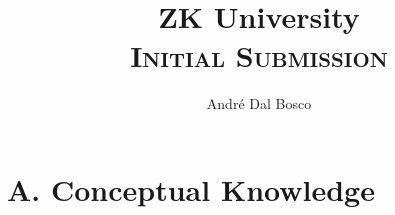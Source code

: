 \documentclass{article}
\title{ZK University \\[4pt] \normalsize\textsc{Initial Submission}}
\author{André Dal Bosco}
\begin{document}
    \maketitle

    \section*{A. Conceptual Knowledge}
\end{document}
